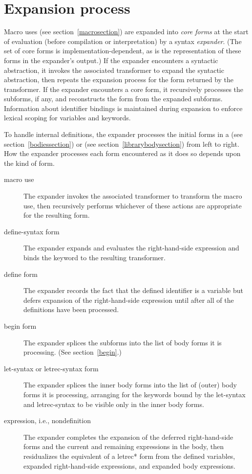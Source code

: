 \chapter{Expansion process}
\label{expansionchapter}

Macro uses (see section~\ref{macrosection}) are expanded into \textit{core
forms} at the start of evaluation (before compilation or interpretation)
by a syntax \emph{expander}.
(The set of core forms is implementation-dependent, as is the
representation of these forms in the expander's output.)
If the expander encounters a syntactic abstraction, it invokes
the associated transformer to expand the syntactic abstraction, then
repeats the expansion process for the form returned by the transformer.
If the expander encounters a core form, it recursively
processes the subforms, if any, and reconstructs the form from the
expanded subforms.
Information about identifier bindings is maintained during expansion
to enforce lexical scoping for variables and keywords.

To handle internal definitions, the expander processes the initial
forms in a  (see section~\ref{bodiessection}) or
 (see section~\ref{librarybodysection})
from left to
right.  How the expander processes each form encountered as it does so
depends upon the kind of form.

\begin{description}
\item[macro use]
The expander invokes the associated transformer to transform the macro
use, then recursively performs whichever of these actions are appropriate
for the resulting form.

\item[{\cf define-syntax} form]
The expander expands and evaluates the right-hand-side expression and binds the
keyword to the resulting transformer.

\item[{\cf define} form]
The expander records the fact that the defined identifier is a variable but defers
expansion of the right-hand-side expression until after all of the
definitions have been processed.

\item[{\cf begin} form]
The expander splices the subforms into the list of body forms it is
processing.  (See section~\ref{begin}.)

\item[{\cf let-syntax} or {\cf letrec-syntax} form]
The expander splices the inner body forms into the list of (outer) body forms it is
processing, arranging for the keywords bound by the {\cf let-syntax}
and {\cf letrec-syntax} to be visible only in the inner body forms.

\item[expression, i.e., nondefinition]
The expander completes the expansion of the deferred right-hand-side forms
and the current and remaining expressions in the body, then
residualizes the equivalent of a {\cf letrec*} form from the defined variables,
expanded right-hand-side expressions, and expanded body expressions.
\end{description}

